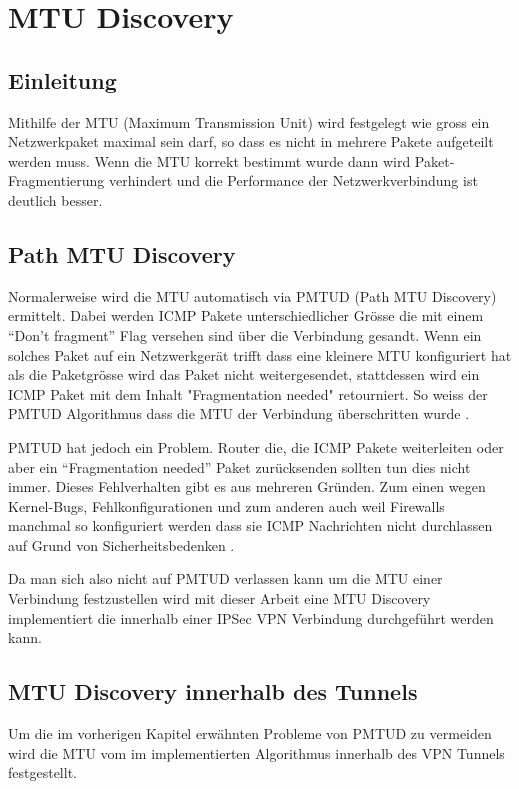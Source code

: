 \section{MTU Discovery}
\label{sec:MTU Discovery}

\subsection{Einleitung}
Mithilfe der \acs{MTU} (Maximum Transmission Unit) wird festgelegt wie gross ein Netzwerkpaket maximal sein darf, so dass es nicht in mehrere Pakete aufgeteilt werden muss. Wenn die \acs{MTU} korrekt bestimmt wurde dann wird Paket-Fragmentierung verhindert und die Performance der Netzwerkverbindung ist deutlich besser. 

\subsection{Path MTU Discovery}
Normalerweise wird die \acs{MTU} automatisch via \acs{PMTUD} (Path MTU Discovery) ermittelt. Dabei werden \acs{ICMP} Pakete unterschiedlicher Grösse die mit einem \enquote{Don't fragment} Flag versehen sind über die Verbindung gesandt. Wenn ein solches Paket auf ein Netzwerkgerät trifft dass eine kleinere \acs{MTU} konfiguriert hat als die Paketgrösse wird das Paket nicht weitergesendet, stattdessen wird ein \acs{ICMP} Paket mit dem Inhalt "Fragmentation needed" retourniert. So weiss der \acs{PMTUD} Algorithmus dass die \acs{MTU} der Verbindung überschritten wurde \cite[:131]{rfc1191}.

\acs{PMTUD} hat jedoch ein Problem. Router die, die \acs{ICMP} Pakete weiterleiten oder aber ein \enquote{Fragmentation needed} Paket zurücksenden sollten tun dies nicht immer. Dieses Fehlverhalten gibt es aus mehreren Gründen. Zum einen wegen Kernel-Bugs, Fehlkonfigurationen und zum anderen auch weil Firewalls manchmal so konfiguriert werden dass sie \acs{ICMP} Nachrichten nicht durchlassen auf Grund von Sicherheitsbedenken \cite[:137]{rfc2923}.

Da man sich also nicht auf \acs{PMTUD} verlassen kann um die \acs{MTU} einer Verbindung festzustellen wird mit dieser Arbeit eine \acs{MTU} Discovery implementiert die innerhalb einer \acs{IPSec} \acs{VPN} Verbindung durchgeführt werden kann.

\subsection{MTU Discovery innerhalb des Tunnels}
Um die im vorherigen Kapitel erwähnten Probleme von \acs{PMTUD} zu vermeiden wird die \acs{MTU} vom im \tool{} implementierten Algorithmus innerhalb des \acs{VPN} Tunnels festgestellt.

